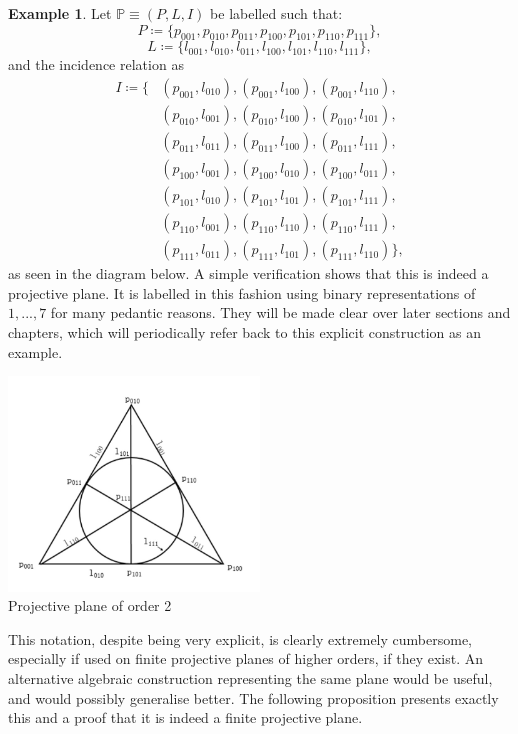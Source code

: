 \documentclass{report}
\renewcommand{\P}{\mathbb{P}}
\theoremstyle{definition}\newtheorem*{definition}{Definition}
\theoremstyle{definition}\newtheorem*{example}{Example}
\theoremstyle{remark}\newtheorem*{remark}{Remark}
\begin{document}
\begin{example}
Let $ \P \equiv (P, L, I) $ be labelled such that: $$ P \coloneqq \{ p_{001}, p_{010}, p_{011}, p_{100}, p_{101}, p_{110}, p_{111} \}, $$ $$ L \coloneqq \{ l_{001}, l_{010}, l_{011}, l_{100}, l_{101}, l_{110}, l_{111} \}, $$ and the incidence relation as
\begin{align*}
I \coloneqq \{
& (p_{001}, l_{010}), (p_{001}, l_{100}), (p_{001}, l_{110}), \\
& (p_{010}, l_{001}), (p_{010}, l_{100}), (p_{010}, l_{101}), \\
& (p_{011}, l_{011}), (p_{011}, l_{100}), (p_{011}, l_{111}), \\
& (p_{100}, l_{001}), (p_{100}, l_{010}), (p_{100}, l_{011}), \\
& (p_{101}, l_{010}), (p_{101}, l_{101}), (p_{101}, l_{111}), \\
& (p_{110}, l_{001}), (p_{110}, l_{110}), (p_{110}, l_{111}), \\
& (p_{111}, l_{011}), (p_{111}, l_{101}), (p_{111}, l_{110}) \},
\end{align*}
as seen in the diagram below. A simple verification shows that this is indeed a projective plane. It is labelled in this fashion using binary representations of $ 1, ..., 7 $ for many pedantic reasons. They will be made clear over later sections and chapters, which will periodically refer back to this explicit construction as an example.
\begin{center}
\includegraphics[width=0.5\textwidth]{figures/fano_plane.jpg} \\
Projective plane of order 2
\end{center}
\end{example}

This notation, despite being very explicit, is clearly extremely cumbersome, especially if used on finite projective planes of higher orders, if they exist. An alternative algebraic construction representing the same plane would be useful, and would possibly generalise better. The following proposition presents exactly this and a proof that it is indeed a finite projective plane.
\end{document}
